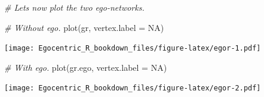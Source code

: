 \documentclass[
]{book}
\newenvironment{Shaded}{\begin{snugshade}}{\end{snugshade}}
\newcommand{\AttributeTok}[1]{\textcolor[rgb]{0.77,0.63,0.00}{#1}}
\newcommand{\CommentTok}[1]{\textcolor[rgb]{0.56,0.35,0.01}{\textit{#1}}}
\newcommand{\ConstantTok}[1]{\textcolor[rgb]{0.00,0.00,0.00}{#1}}
\newcommand{\FunctionTok}[1]{\textcolor[rgb]{0.00,0.00,0.00}{#1}}
\newcommand{\NormalTok}[1]{#1}
\begin{document}
\begin{Shaded}
\begin{Highlighting}[]
\CommentTok{\# Let\textquotesingle{}s now plot the two ego{-}networks.}

\CommentTok{\# Without ego.}
\FunctionTok{plot}\NormalTok{(gr, }\AttributeTok{vertex.label =} \ConstantTok{NA}\NormalTok{)}
\end{Highlighting}
\end{Shaded}

\texttt{[image: Egocentric\_R\_bookdown\_files/figure-latex/egor-1.pdf]}

\begin{Shaded}
\begin{Highlighting}[]
\CommentTok{\# With ego.}
\FunctionTok{plot}\NormalTok{(gr.ego, }\AttributeTok{vertex.label =} \ConstantTok{NA}\NormalTok{)}
\end{Highlighting}
\end{Shaded}

\texttt{[image: Egocentric\_R\_bookdown\_files/figure-latex/egor-2.pdf]}
\end{document}
